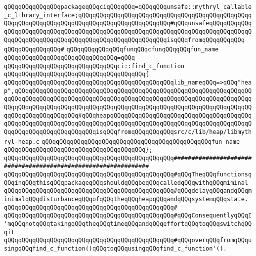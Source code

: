 \verb|qQQqqQQqqQQqqQQqpackageqQQqciqQQqqQQq=qQQqqQQqunsafe::mythryl_callable_c_library_interface;qQQqqQQqqQQqqQQqqQQqqQQqqQQqqQQqqQQqqQQqqQQqqQQqqQQqqQQqqQQqqQQqqQQqqQQqqQQqqQQqqQQqqQQqqQQqqQQq#qQQqunsafeqQQqqQQqqQQqqQQqqQQqqQQqqQQqqQQqqQQqqQQqqQQqqQQqqQQqqQQqqQQqqQQqqQQqqQQqqQQqqQQqqQQqqQQqqQQqqQQqqQQqqQQqqQQqqQQqqQQqqQQqqQQqqQQqisqQQqfromqQQqqQQqqQQq|\newline
\verb|qQQqqQQqqQQqqQQq#|\newline
\verb|qQQqqQQqqQQqqQQqfunqQQqcfunqQQqqQQqfun_name|\newline
\verb|qQQqqQQqqQQqqQQqqQQqqQQqqQQqqQQq=qQQq|\newline
\verb|qQQqqQQqqQQqqQQqqQQqqQQqqQQqqQQqci::find_c_function|\newline
\verb|qQQqqQQqqQQqqQQqqQQqqQQqqQQqqQQqqQQqqQQq{|\newline
\verb|qQQqqQQqqQQqqQQqqQQqqQQqqQQqqQQqqQQqqQQqqQQqqQQqlib_nameqQQq=>qQQq"heap",qQQqqQQqqQQqqQQqqQQqqQQqqQQqqQQqqQQqqQQqqQQqqQQqqQQqqQQqqQQqqQQqqQQqqQQqqQQqqQQqqQQqqQQqqQQqqQQqqQQqqQQqqQQqqQQqqQQqqQQqqQQqqQQqqQQqqQQqqQQqqQQqqQQqqQQqqQQqqQQqqQQqqQQqqQQqqQQqqQQqqQQqqQQqqQQqqQQqqQQqqQQqqQQqqQQqqQQqqQQqqQQqqQQq#qQQqheapqQQqqQQqqQQqqQQqqQQqqQQqqQQqqQQqqQQqqQQqqQQqqQQqqQQqqQQqqQQqqQQqqQQqqQQqqQQqqQQqqQQqqQQqqQQqqQQqqQQqqQQqqQQqqQQqqQQqqQQqqQQqqQQqqQQqqQQqisqQQqfromqQQqqQQqqQQqsrc/c/lib/heap/libmythryl-heap.c|\newline
\verb|qQQqqQQqqQQqqQQqqQQqqQQqqQQqqQQqqQQqqQQqqQQqqQQqfun_name|\newline
\verb|qQQqqQQqqQQqqQQqqQQqqQQqqQQqqQQqqQQqqQQq};|\newline
\verb|qQQqqQQqqQQqqQQqqQQqqQQqqQQqqQQqqQQqqQQqqQQqqQQq###############################################################|\newline
\verb|qQQqqQQqqQQqqQQqqQQqqQQqqQQqqQQqqQQqqQQqqQQqqQQq#qQQqTheqQQqfunctionsqQQqinqQQqthisqQQqpackageqQQqshouldqQQqbeqQQqcalledqQQqwithqQQqmiminal|\newline
\verb|qQQqqQQqqQQqqQQqqQQqqQQqqQQqqQQqqQQqqQQqqQQqqQQq#qQQqdelayqQQqandqQQqminimalqQQqdisturbanceqQQqofqQQqtheqQQqheapqQQqandqQQqsystemqQQqstate.|\newline
\verb|qQQqqQQqqQQqqQQqqQQqqQQqqQQqqQQqqQQqqQQqqQQqqQQq#|\newline
\verb|qQQqqQQqqQQqqQQqqQQqqQQqqQQqqQQqqQQqqQQqqQQqqQQq#qQQqConsequentlyqQQqI'mqQQqnotqQQqtakingqQQqtheqQQqtimeqQQqandqQQqeffortqQQqtoqQQqswitchqQQqit|\newline
\verb|qQQqqQQqqQQqqQQqqQQqqQQqqQQqqQQqqQQqqQQqqQQqqQQq#qQQqoverqQQqfromqQQqusingqQQqfind_c_function()qQQqtoqQQqusingqQQqfind_c_function'().|\newline
